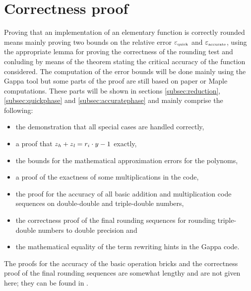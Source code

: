 \section{Correctness proof\label{sec:proof}}
Proving that an implementation of an elementary function is correctly rounded means mainly proving two 
bounds on the relative error $\epsilon_{\mbox{\tiny quick}}$ and $\epsilon_{\mbox{\tiny accurate}}$, using the appropriate lemma for proving the
correctness of the rounding test and conluding by means of the theorem stating the critical accuracy of the 
function considered. The computation of the error bounds will be done mainly using the Gappa tool\cite{Melqu05} but
some parts of the proof are still based on paper or Maple computations. These parts will be shown in sections 
\ref{subsec:reduction}, \ref{subsec:quickphase} and \ref{subsec:accuratephase} and mainly comprise the following:
\begin{itemize}
\item the demonstration that all special cases are handled correctly, 
\item a proof that $z_\hi + z_\lo = r_i \cdot y - 1$ exactly,
\item the bounds for the mathematical approximation errors for the polynoms,
\item a proof of the exactness of some multiplications in the code,
\item the proof for the accuracy of all basic addition and multiplication code sequences on 
double-double and triple-double numbers,
\item the correctness proof of the final rounding sequences for rounding triple-double numbers to double precision and
\item the mathematical equality of the term rewriting hints in the Gappa code.
\end{itemize}
The proofs for the accuracy of the basic operation bricks and the correctness proof of the final rounding sequences
are somewhat lengthy and are not given here; they can be found in \cite{Lau05}.
